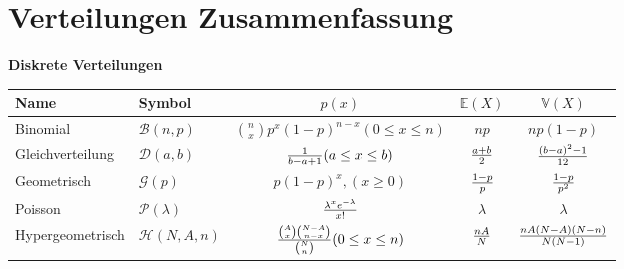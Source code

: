{    \section{Verteilungen Zusammenfassung}
    \textbf{Diskrete Verteilungen}\\
    \begin{tabular}{|l|l|c|c|c|}\hline
    Name & Symbol & $p(x)$ & $\mathbb E(X)$ & $\mathbb V(X)$ \\\hline
    Binomial\index{Binomialverteilung}\label{diskrete_verteilung:binomial} & $\mathcal B(n,p)$ & ${n\choose x}p^x(1-p)^{n-x} (0\le x\le n)$& $np$ & $np(1-p)$ \\\hline
    Gleichverteilung\index{Gleichverteilung} & $\mathcal D(a,b)$& ${1\over b-a+1} (a\le x\le b)$ & ${a+b\over 2}$&
    ${(b-a)^2-1\over 12}$ \\\hline
    Geometrisch\index{Geometrische Verteilung}\label{diskrete_verteilung:geometrisch} & $\mathcal G(p)$ & $p(1-p)^x, (x\ge 0)$ & ${1-p\over p}$ & ${1-p\over p^2}$
    \\\hline
    Poisson\index{Poissonverteilung}& $\mathcal P(\lambda)$ & ${\lambda^xe^{-\lambda}\over x!}$ & $\lambda$
    & $\lambda$ \\\hline
    Hypergeometrisch\index{Hypergeometrische Verteilung} & $\mathcal H(N,A,n)$
    & ${{A\choose x}{N-A\choose n-x}\over {N\choose n}} (0\le x\le n)$ &
    $nA\over N$ & $ nA(N-A)(N-n)\over N(N-1)$\\\hline
    \end{tabular}

}
